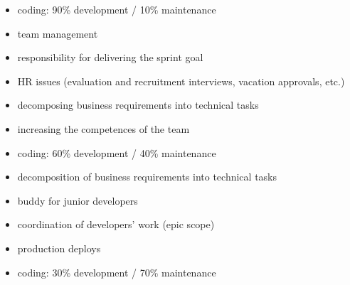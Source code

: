 \documentclass{resume}
\begin{document}
\begin{adjustwidth}{2em}{0em}

\begin{flushleft}{}\end{flushleft}
\begin{itemize}
    \item coding: 90\% development / 10\% maintenance
    \item team management
    \item responsibility for delivering the sprint goal
    \item HR issues (evaluation and recruitment interviews, vacation approvals, etc.)
    \item decomposing business requirements into technical tasks
    \item increasing the competences of the team
\end{itemize}
\vspace{0.5em}

\begin{flushleft}{}\end{flushleft}
\begin{itemize}
    \item coding: 60\% development / 40\% maintenance
    \item decomposition of business requirements into technical tasks
    \item buddy for junior developers
    \item coordination of developers' work (epic scope)
    \item production deploys
\end{itemize}
\vspace{0.5em}

\begin{flushleft}{}\end{flushleft}
\begin{itemize}
    \item coding: 30\% development / 70\% maintenance
\end{itemize}
\vspace{0.5em}


\end{adjustwidth}
\end{document}
